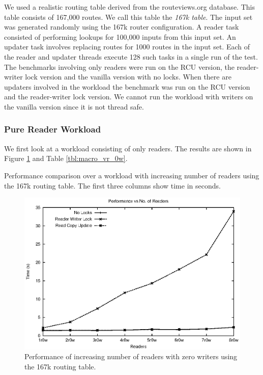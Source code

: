\documentclass[a4paper,marginparwidth=50pt,marginparsep=10pt]{article}
\begin{document}
We used a realistic routing table derived from the routeviews.org
database\cite{routeviews}. This table consists of 167,000 routes. We call this table
the \emph{167k table}. The input set was generated randomly using the
167k router configuration. A reader task consisted of performing
lookups for 100,000 inputs from this input set. An updater task
involves replacing routes for 1000 routes in the input set. Each of
the reader and updater threads execute 128 such tasks in a single run
of the test.\\

The benchmarks involving only readers were run on the RCU version,
the reader-writer lock version and the vanilla version with no
locks. When there are updaters involved in the workload the benchmark
was run on the RCU version and the reader-writer lock version. We
cannot run the workload with writers on the vanilla version since it
is not thread safe.

\subsubsection{Pure Reader Workload}
 We first look at a workload consisting of only readers. The results
 are shown in Figure \ref{img:macro_vr_0w} and Table
 \ref{tbl:macro_vr_0w}.

\begin{table}[tph]
\begin{center}

\end{center}
\caption{Performance comparison over a workload with increasing number of readers using the 167k routing table. The first three columns show time in seconds.}
\label{tbl:macro_vr_0w}
\end{table}

\begin{figure}[tph]
\includegraphics[scale = 0.7]{../images/graphs/macro_vr_0w}
\caption{Performance of increasing number of readers with zero writers using the 167k routing table.}
\label{img:macro_vr_0w}
\end{figure}
\end{document}
